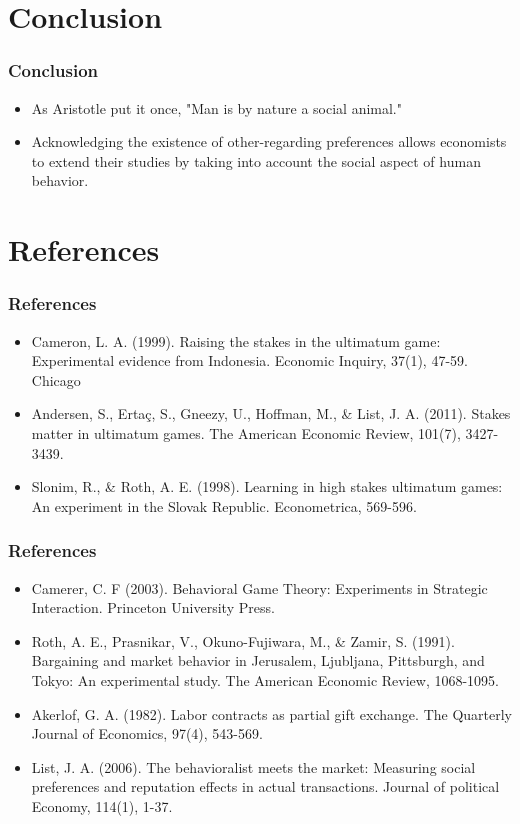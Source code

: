 \documentclass{beamer}
\begin{document}
\section{Conclusion}

\begin{frame}
	\frametitle{Conclusion}
	\begin{itemize}
		\item As Aristotle put it once, "Man is by nature a social animal."
		\item Acknowledging the existence of other-regarding preferences allows economists to extend their studies by taking into account the social aspect of human behavior.
	\end{itemize}
\end{frame}
\section{References}
\begin{frame}
	\frametitle{References}
	\begin{itemize}
		\item Cameron, L. A. (1999). Raising the stakes in the ultimatum game: Experimental evidence from Indonesia. Economic Inquiry, 37(1), 47-59.
		Chicago	
		\item Andersen, S., Ertaç, S., Gneezy, U., Hoffman, M., \& List, J. A. (2011). Stakes matter in ultimatum games. The American Economic Review, 101(7), 3427-3439.
		\item Slonim, R., \& Roth, A. E. (1998). Learning in high stakes ultimatum games: An experiment in the Slovak Republic. Econometrica, 569-596.
		\end{itemize}

\end{frame}

\begin{frame}
	\frametitle{References}
	\begin{itemize}
		\item Camerer, C. F (2003). Behavioral Game Theory: Experiments in Strategic Interaction. Princeton University Press.
		\item Roth, A. E., Prasnikar, V., Okuno-Fujiwara, M., \& Zamir, S. (1991). Bargaining and market behavior in Jerusalem, Ljubljana, Pittsburgh, and Tokyo: An experimental study. The American Economic Review, 1068-1095.
		\item Akerlof, G. A. (1982). Labor contracts as partial gift exchange. The Quarterly Journal of Economics, 97(4), 543-569.
		\item List, J. A. (2006). The behavioralist meets the market: Measuring social preferences and reputation effects in actual transactions. Journal of political Economy, 114(1), 1-37.
	\end{itemize}
	
\end{frame}
\end{document}
